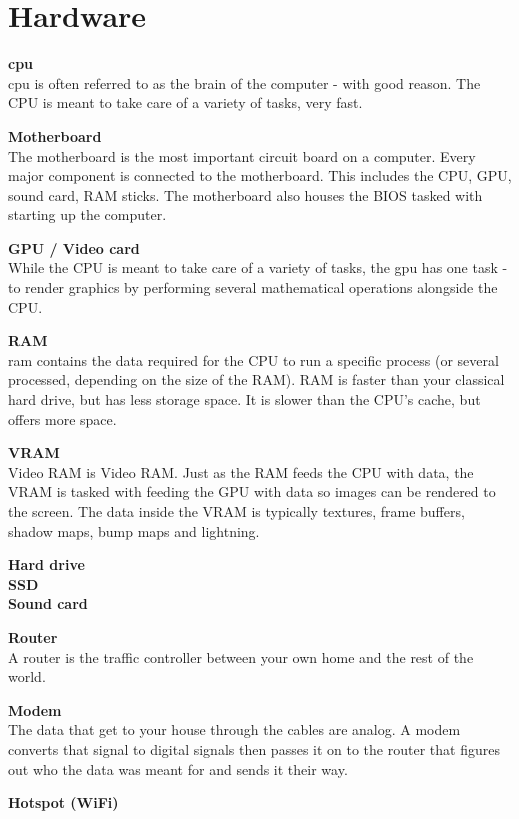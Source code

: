 \section{Hardware}

\textbf{\acrfull{cpu} } \\
\acrfull{cpu} is often referred to as the brain of the computer - with good reason. The CPU is meant to take care of a variety of tasks, very fast. 

\textbf{Motherboard } \\
The motherboard is the most important circuit board on a computer. Every major component is connected to the motherboard. This includes the CPU, GPU, sound card, RAM sticks. The motherboard also houses the BIOS tasked with starting up the computer. 

\textbf{GPU / Video card} \\
While the CPU is meant to take care of a variety of tasks, the \acrfull{gpu} has one task - to render graphics by performing several mathematical operations alongside the CPU.  

\textbf{RAM } \\
\acrfull{ram} contains the data required for the CPU to run a specific process (or several processed, depending on the size of the RAM). RAM is faster than your classical hard drive, but has less storage space. It is slower than the CPU's cache, but offers more space. 

\textbf{VRAM } \\
Video RAM is Video RAM. Just as the RAM feeds the CPU with data, the VRAM is tasked with feeding the GPU with data so images can be rendered to the screen. The data inside the VRAM is typically textures, frame buffers, shadow maps, bump maps and lightning. 

\textbf{Hard drive} \\

\textbf{SSD} \\

\textbf{Sound card}

\textbf{Router } \\
A router is the traffic controller between your own home and the rest of the world. 

\textbf{Modem } \\
The data that get to your house through the cables are analog. A modem converts that signal to digital signals then passes it on to the router that figures out who the data was meant for and sends it their way. 

\textbf{Hotspot (WiFi)} \\




\newpage